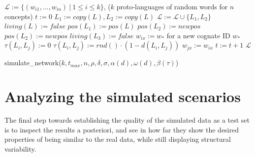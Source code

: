 \begin{algorithm} \small
  \begin{algorithmic}[1]
  \STATE $\mathcal{L} := \{(w_{i1},\dots,w_{in})\ |\ 1 \leq i \leq k\}$, ($k$ proto-languages of random words for $n$ concepts)
  \STATE $t := 0$
        \STATE $L_1 := copy(L), L_2 := copy(L)$
        \STATE $\mathcal{L} := \mathcal{L} \cup \{L_1,L_2\}$
        \STATE $living(L) := false$
        \STATE $pos(L_1) := pos(L)$
          \STATE $pos(L_2) := newpos$
          \STATE $pos(L_2) := newpos$
          \STATE $living(L_3) := false$
        \ENDIF
      \ENDIF
    \ENDFOR
          \STATE $w_{ix} := w_{*}$ for a new cognate ID $w_{*}$
        \ENDIF
      \ENDFOR
    \ENDFOR
        \STATE $\tau(L_i,L_j) := 0$
        \STATE $\tau(L_i,L_j) := rnd() \cdot (1 - d(L_i,L_j))$
      \ENDIF
    \ENDFOR
          \STATE $w_{jx} := w_{ix}$
        \ENDIF
      \ENDFOR
    \ENDFOR
    \STATE $t := t + 1$
  \ENDWHILE
  \RETURN $\mathcal{L}$
  \end{algorithmic}
  \caption{simulate\_network($k,t_{max},n,\rho,\delta,\sigma,\alpha(d),\omega(d),\beta(\tau)$)}
  \label{alg:simulation}
\end{algorithm}


\section{Analyzing the simulated scenarios}
The final step towards establishing the quality of the simulated data as a test set is to inspect the results a posteriori, and see in how far they show the desired properties of being similar to the real data, while still displaying structural variability.


